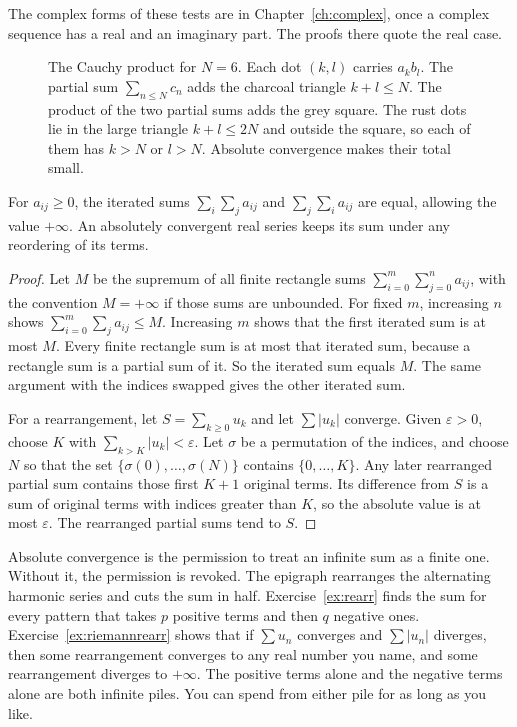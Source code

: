 The complex forms of these tests are in Chapter~\ref{ch:complex}, once a complex sequence has a real and an imaginary part. The proofs there quote the real case.

\begin{figure}[ht]
\centering
{}
\caption{The Cauchy product for $N=6$. Each dot $(k,l)$ carries $a_kb_l$. The partial sum $\sum_{n\le N}c_n$ adds the charcoal triangle $k+l\le N$. The product of the two partial sums adds the grey square. The rust dots lie in the large triangle $k+l\le2N$ and outside the square, so each of them has $k>N$ or $l>N$. Absolute convergence makes their total small.}
\label{fig:cauchyprod}
\end{figure}

\begin{proposition}\label{prop:safe-sums}
For $a_{ij}\ge0$, the iterated sums $\sum_i\sum_j a_{ij}$ and $\sum_j\sum_i a_{ij}$ are equal, allowing the value $+\infty$. An absolutely convergent real series keeps its sum under any reordering of its terms.
\end{proposition}
\begin{proof}
Let $M$ be the supremum of all finite rectangle sums $\sum_{i=0}^m\sum_{j=0}^n a_{ij}$, with the convention $M=+\infty$ if those sums are unbounded. For fixed $m$, increasing $n$ shows $\sum_{i=0}^m\sum_j a_{ij}\le M$. Increasing $m$ shows that the first iterated sum is at most $M$. Every finite rectangle sum is at most that iterated sum, because a rectangle sum is a partial sum of it. So the iterated sum equals $M$. The same argument with the indices swapped gives the other iterated sum.

For a rearrangement, let $S=\sum_{k\ge0}u_k$ and let $\sum|u_k|$ converge. Given $\varepsilon>0$, choose $K$ with $\sum_{k>K}|u_k|<\varepsilon$. Let $\sigma$ be a permutation of the indices, and choose $N$ so that the set $\{\sigma(0),\ldots,\sigma(N)\}$ contains $\{0,\ldots,K\}$. Any later rearranged partial sum contains those first $K+1$ original terms. Its difference from $S$ is a sum of original terms with indices greater than $K$, so the absolute value is at most $\varepsilon$. The rearranged partial sums tend to $S$.
\end{proof}


Absolute convergence is the permission to treat an infinite sum as a finite one. Without it, the permission is revoked. The epigraph rearranges the alternating harmonic series and cuts the sum in half. Exercise~\ref{ex:rearr} finds the sum for every pattern that takes $p$ positive terms and then $q$ negative ones. Exercise~\ref{ex:riemannrearr} shows that if $\sum u_n$ converges and $\sum|u_n|$ diverges, then some rearrangement converges to any real number you name, and some rearrangement diverges to $+\infty$. The positive terms alone and the negative terms alone are both infinite piles. You can spend from either pile for as long as you like.

